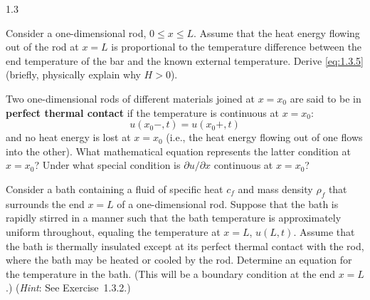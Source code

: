 \begin{exercises}{1.3}

\item Consider a one-dimensional rod, $0 \le x \le L$. Assume that the heat energy flowing out of the rod at $x = L$ is proportional to the temperature difference between the end temperature of the bar and the known external temperature. Derive \eqref{eq:1.3.5} (briefly, physically explain why $H > 0$).

\item[\starred 1.3.2.] Two one-dimensional rods of different materials joined at $x = x_0$ are said to be in \textbf{perfect thermal contact} if the temperature is continuous at $x = x_0$:
\[
u(x_0-,t) = u(x_0+,t)
\]
and no heat energy is lost at $x = x_0$ (i.e., the heat energy flowing out of one flows into the other). What mathematical equation represents the latter condition at $x = x_0$? Under what special condition is $\partial u/\partial x$ continuous at $x = x_0$?

\item[\starred 1.3.3.] Consider a bath containing a fluid of specific heat $c_f$ and mass density $\rho_f$ that surrounds the end $x = L$ of a one-dimensional rod. Suppose that the bath is rapidly stirred in a manner such that the bath temperature is approximately uniform throughout, equaling the temperature at $x = L$, $u(L,t)$. Assume that the bath is thermally insulated except at its perfect thermal contact with the rod, where the bath may be heated or cooled by the rod. Determine an equation for the temperature in the bath. (This will be a boundary condition at the end $x = L$.) (\emph{Hint}: See Exercise~1.3.2.)

\end{exercises}
